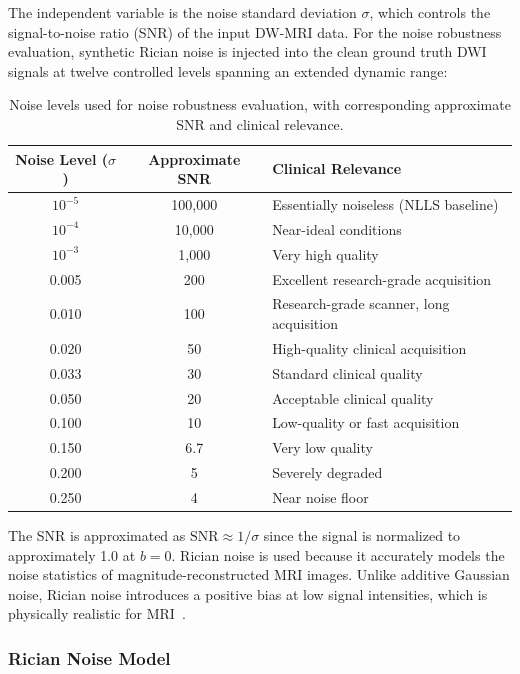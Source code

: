 \documentclass[12pt]{article}
\begin{document}
The independent variable is the noise standard deviation $\sigma$, which controls the signal-to-noise ratio (SNR) of the input DW-MRI data. For the noise robustness evaluation, synthetic Rician noise is injected into the clean ground truth DWI signals at twelve controlled levels spanning an extended dynamic range:

\begin{table}[h]
\centering
\caption{Noise levels used for noise robustness evaluation, with corresponding approximate SNR and clinical relevance.}
\label{tab:noise_levels}
\begin{tabular}{ccl}
\toprule
\textbf{Noise Level ($\sigma$)} & \textbf{Approximate SNR} & \textbf{Clinical Relevance} \\
\midrule
$10^{-5}$ & 100,000  & Essentially noiseless (NLLS baseline) \\
$10^{-4}$ & 10,000   & Near-ideal conditions \\
$10^{-3}$ & 1,000    & Very high quality \\
0.005 & 200   & Excellent research-grade acquisition \\
0.010 & 100  & Research-grade scanner, long acquisition \\
0.020 & 50   & High-quality clinical acquisition \\
0.033 & 30   & Standard clinical quality \\
0.050 & 20   & Acceptable clinical quality \\
0.100 & 10   & Low-quality or fast acquisition \\
0.150 & 6.7  & Very low quality \\
0.200 & 5    & Severely degraded \\
0.250 & 4    & Near noise floor \\
\bottomrule
\end{tabular}
\end{table}

The SNR is approximated as $\text{SNR} \approx 1/\sigma$ since the signal is normalized to approximately 1.0 at $b=0$. Rician noise is used because it accurately models the noise statistics of magnitude-reconstructed MRI images. Unlike additive Gaussian noise, Rician noise introduces a positive bias at low signal intensities, which is physically realistic for MRI~\cite{gudbjartsson1995}.

\subsubsection{Rician Noise Model}
\end{document}

